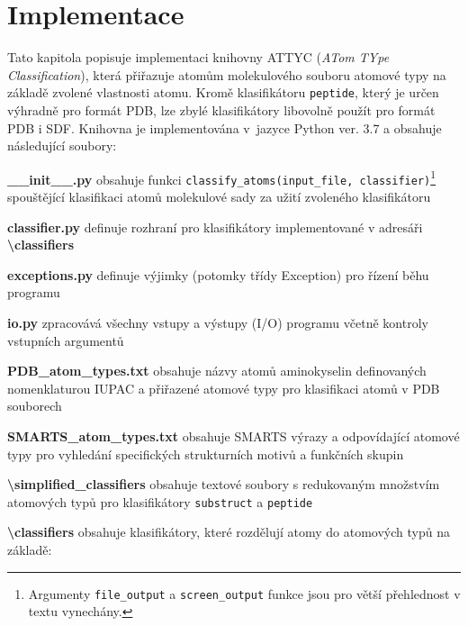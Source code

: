 \chapter{Implementace}
Tato kapitola popisuje implementaci knihovny ATTYC (\textit{ATom TYpe Classification}), která přiřazuje atomům molekulového souboru atomové typy na základě zvolené vlastnosti atomu. Kromě klasifikátoru \verb|peptide|, který je určen výhradně pro formát PDB, lze zbylé klasifikátory libovolně použít pro formát PDB i SDF. Knihovna je implementována v~jazyce Python ver. 3.7 a obsahuje následující soubory:

\vspace{0.4cm}
\noindent {} \textbf{\_\_init\_\_.py} obsahuje funkci \verb|classify_atoms(input_file, classifier)|\footnote{Argumenty \texttt{file\_output} a \texttt{screen\_output} funkce jsou pro větší přehlednost v textu vynechány.}
spouštějící klasifikaci atomů molekulové sady za uži\-tí zvoleného klasifikátoru

\medskip
\noindent \textbf{classifier.py} definuje rozhraní pro klasifikátory implementované v adresáři \textbf{\textbackslash classifiers}

\medskip
\noindent \textbf{exceptions.py} definuje výjimky (potomky třídy Exception) pro řízení běhu programu

\medskip
\noindent {}\textbf{io.py} zpracovává všechny vstupy a výstupy (I/O) programu včetně kontroly vstupních argumentů 

\medskip
\noindent {}\textbf{PDB\_atom\_types.txt} obsahuje názvy atomů aminokyselin definovaných nomenklaturou IUPAC a přiřazené atomové typy pro klasifikaci atomů v PDB souborech

\medskip
\noindent {}\textbf{SMARTS\_atom\_types.txt} obsahuje SMARTS výrazy a odpovídající atomové typy pro vyhledání specifických strukturních motivů a funkčních skupin 

\medskip
\noindent {}\textbf{\textbackslash simplified\_classifiers} obsahuje textové soubory s redukovaným množstvím atomových typů pro klasifikátory \verb|substruct| a \verb|peptide|

\medskip
\noindent\textbf{\textbackslash classifiers} obsahuje klasifikátory, které rozdělují atomy do atomových typů na základě:

